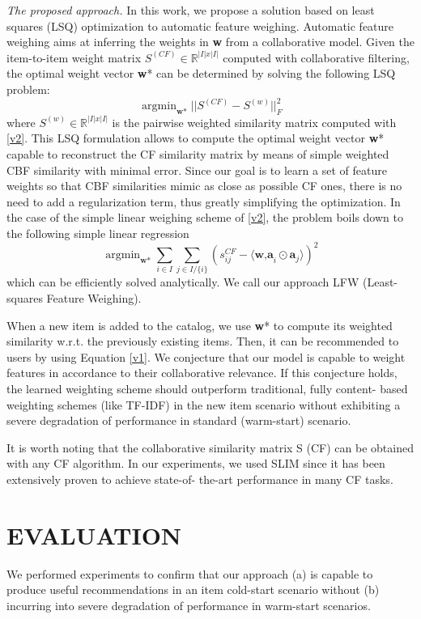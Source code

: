 \documentclass{sig-alternate}
\DeclareMathOperator*{\argmin}{argmin}
\begin{document}
\textit{The proposed approach.} In this work, we propose a solution based
on least squares (LSQ) optimization to automatic feature weighing.
Automatic feature weighing aims at inferring the weights in \textbf{w}
from a collaborative model. Given the item-to-item weight matrix
$S^{(CF)} \in \mathbb{R}^{|I |x |I |}$ computed with collaborative filtering, the optimal
weight vector \textbf{w}* can be determined by solving the following LSQ
problem:
\begin{equation}
    \argmin_{\textbf{w}*}||S^{(CF)}-S^{(w)}||^2_F
\label{v3}
\end{equation}
where $S^{(w)} \in \mathbb{R}^{|I |x |I |}$ is the pairwise weighted similarity matrix
computed with \ref{v2}. This LSQ formulation allows to compute the
optimal weight vector \textbf{w}* capable to reconstruct the CF similarity
matrix by means of simple weighted CBF similarity with minimal
error. Since our goal is to learn a set of feature weights so that CBF
similarities mimic as close as possible CF ones, there is no need to
add a regularization term, thus greatly simplifying the optimization.
In the case of the simple linear weighing scheme of \ref{v2}, the problem
boils down to the following simple linear regression
\begin{equation}
    \argmin_{\textbf{w}*}\sum_{i\in I} \sum_{j\in I/\{i\}}(s_{ij}^{CF}-\langle \textbf{w,a}_i\odot \textbf{a}_j\rangle)^2 
\label{v4}
\end{equation}
which can be efficiently solved analytically. We call our approach
LFW (Least-squares Feature Weighing).

When a new item is added to the catalog, we use \textbf{w}* to compute
its weighted similarity w.r.t. the previously existing items. Then,
it can be recommended to users by using Equation \ref{v1}. We conjecture
that our model is capable to weight features in accordance to
their collaborative relevance. If this conjecture holds, the learned
weighting scheme should outperform traditional, fully content-
based weighting schemes (like TF-IDF) in the new item scenario
without exhibiting a severe degradation of performance in standard
(warm-start) scenario.

It is worth noting that the collaborative similarity matrix S (CF)
can be obtained with any CF algorithm. In our experiments, we
used SLIM since it has been extensively proven to achieve state-of-
the-art performance in many CF tasks.

\section{EVALUATION}
We performed experiments to confirm that our approach (a) is capable
to produce useful recommendations in an item cold-start
scenario without (b) incurring into severe degradation of performance
in warm-start scenarios.
\newline
\end{document}
